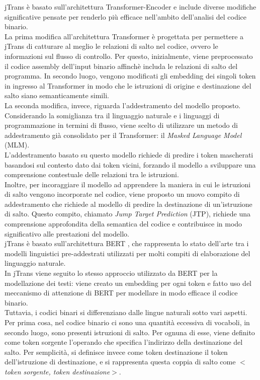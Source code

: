 \documentclass[12pt,a4paper,openright,twoside]{report}
\begin{document}
 jTrans è basato sull'architettura Transformer-Encoder e include diverse modifiche significative pensate per renderlo più efficace nell'ambito dell'analisi del codice binario.\\
 La prima modifica all'architettura Transformer è progettata per permettere a jTrans di catturare al meglio le relazioni di salto nel codice, ovvero le informazioni sul flusso di controllo. Per questo, inizialmente, viene preprocessato il codice assembly dell'input binario affinchè includa le relazioni di salto del programma. In secondo luogo, vengono modificati gli embedding dei singoli token in ingresso al Transformer in modo che le istruzioni di origine e destinazione del salto siano semanticamente simili.\\
 La seconda modifica, invece, riguarda l'addestramento del modello proposto. Considerando la somiglianza tra il linguaggio naturale e i linguaggi di programmazione in termini di flusso, viene scelto di utilizzare un metodo di addestramento già consolidato per il Transformer: il \textit{Masked Language Model} (MLM).\\
 L'addestramento basato su questo modello richiede di predire i token mascherati basandosi sul contesto dato dai token vicini, forzando il modello a sviluppare una comprensione contestuale delle relazioni tra le istruzioni.\\
 Inoltre, per incoraggiare il modello ad apprendere la maniera in cui le istruzioni di salto vengono incorporate nel codice, viene proposto un nuovo compito di addestramento che richiede al modello di predire la destinazione di un'istruzione di salto. Questo compito, chiamato \textit{Jump Target Prediction} (JTP), richiede una comprensione approfondita della semantica del codice e contribuisce in modo significativo alle prestazioni del modello.\\
 jTrans è basato sull'architettura BERT \cite{BERT}, che rappresenta lo stato dell'arte tra i modelli linguistici pre-addestrati utilizzati per molti compiti di elaborazione del linguaggio naturale.\\
 In jTrans viene seguito lo stesso approccio utilizzato da BERT per la modellazione dei testi: viene creato un embedding per ogni token e fatto uso del meccanismo di attenzione di BERT per modellare in modo efficace il codice binario. \\
 Tuttavia, i codici binari si differenziano dalle lingue naturali sotto vari aspetti. Per prima cosa, nel codice binario ci sono una quantità eccessiva di vocaboli, in secondo luogo, sono presenti istruzioni di salto.  Per ognuna di esse, viene definito come token sorgente l'operando che specifica l'indirizzo della destinazione del salto. Per semplicità, si definisce invece come token destinazione il token dell'istruzione di destinazione, e si rappresenta questa coppia di salto come \textit{$<$token sorgente, token destinazione$>$}.\\
\end{document}
